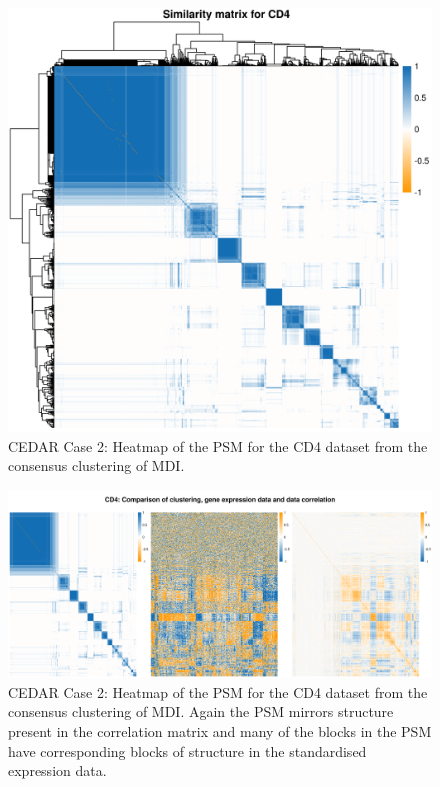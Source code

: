 \documentclass[14pt]{extarticle} %
\begin{document}
	\begin{figure}[h]
		\centering
		\includegraphics[scale=0.75]{Images/Biology_data/Set_1000/All_datasets/Similarity_matrices/similarity_matrix_CD4.png}
		\caption{CEDAR Case 2: Heatmap of the PSM for the CD4 dataset from the consensus clustering of MDI.}
		\label{fig:results:cedar_2:mdi_cd4_psm}
	\end{figure}
	
	
	\begin{figure}
		\centering
		\includegraphics[scale=0.5]{Images/Biology_data/Set_1000/All_datasets/Comparison_expression_clustering_correlation/CD4.png}
		\caption{CEDAR Case 2: Heatmap of the PSM for the CD4 dataset from the consensus clustering of MDI. Again the PSM mirrors structure present in the correlation matrix and many of the blocks in the PSM have corresponding blocks of structure in the standardised expression data.}
		\label{fig:results:cedar_2:mdi_cd4_psm_expr_cor}
	\end{figure}
	
\end{document}
